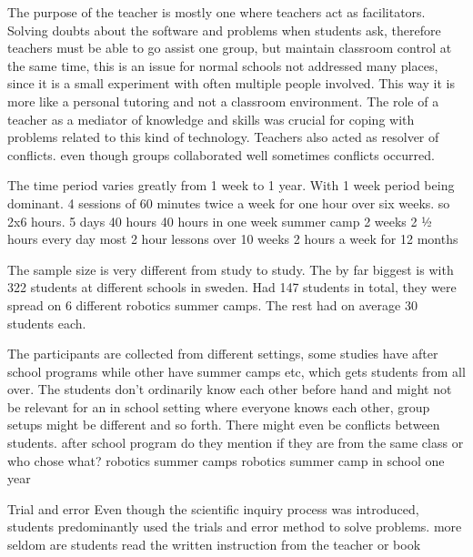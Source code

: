 \bigskip\noindent
The purpose of the teacher is mostly one where teachers act as facilitators. Solving doubts about the software and problems when students ask, therefore teachers must be able to go assist one group, but maintain classroom control at the same time, this is an issue for normal schools not addressed many places, since it is a small experiment with often multiple people involved. This way it is more like a personal tutoring and not a classroom environment. 
\cite{lindh2007does} The role of a teacher as a mediator of knowledge and skills was crucial for coping with problems related to this kind of technology. 
\cite{lindh2007does} Teachers also acted as resolver of conflicts. even though groups collaborated well sometimes conflicts occurred. 

\bigskip\noindent
The time period varies greatly from 1 week to 1 year. With 1 week period being dominant.
\cite{mitnik2009collaborative} 4 sessions of 60 minutes
\cite{barker2007robotics} twice a week for one hour over six weeks. so 2x6 hours. 
\cite{nugent2008effect} 5 days 40 hours
\cite{nugent2009use} 40 hours in one week summer camp
\cite{williams2007acquisition} 2 weeks 2 ½ hours every day
\cite{norton2004using} most 2 hour lessons over 10 weeks
\cite{lindh2007does} 2 hours a week for 12 months

\bigskip\noindent
The sample size is very different from study to study. The by far biggest is \cite{lindh2007does} with 322 students at different schools in sweden. \cite{nugent2009use} Had 147 students in total, they were spread on 6 different robotics summer camps. The rest had on average 30 students each.

\bigskip\noindent
The participants are collected from different settings, some studies have after school programs while other have summer camps etc, which gets students from all over. The students don't ordinarily know each other before hand and might not be relevant for an in school setting where everyone knows each other, group setups might be different and so forth. There might even be conflicts between students.
\cite{barker2007robotics} after school program do they mention if they are from the same class or who chose what?
\cite{nugent2009use} robotics summer camps
\cite{williams2007acquisition} robotics summer camp
\cite{lindh2007does} in school one year

\bigskip\noindent
Trial and error 
\cite{williams2007acquisition} Even though the scientific inquiry process was introduced, students predominantly used the trials and error method to solve problems. 
\cite{lindh2007does}more seldom are students read the written instruction from the teacher or book

